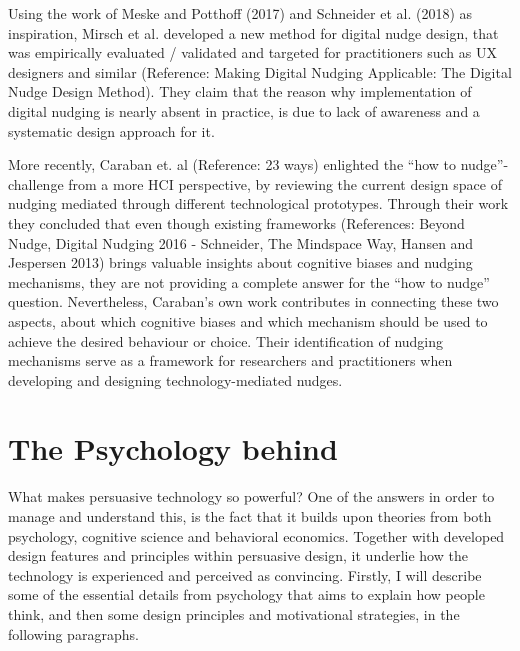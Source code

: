 Using the work of Meske and Potthoff (2017) and Schneider et al. (2018) as inspiration, Mirsch et al. developed a new method for digital nudge design, that was empirically evaluated / validated and targeted for practitioners such as UX designers and similar (Reference: Making Digital Nudging Applicable: The Digital Nudge Design Method). They claim that the reason why implementation of digital nudging is nearly absent in practice, is due to lack of awareness and a systematic design approach for it.

More recently, Caraban et. al (Reference: 23 ways) enlighted the “how to nudge”-challenge from a more HCI perspective, by reviewing the current design space of nudging mediated through different technological prototypes. Through their work they concluded that even though existing frameworks (References: Beyond Nudge, Digital Nudging 2016 - Schneider, The Mindspace Way, Hansen and Jespersen 2013) brings valuable insights about cognitive biases and nudging mechanisms, they are not providing a complete answer for the “how to nudge” question. Nevertheless, Caraban’s own work contributes in connecting these two aspects, about which cognitive biases and which mechanism should be used to achieve the desired behaviour or choice. Their identification of nudging mechanisms serve as a framework for researchers and practitioners when developing and designing technology-mediated nudges. 

\section{The Psychology behind }
What makes persuasive technology so powerful? One of the answers in order to manage and understand this, is the fact that it builds upon theories from both psychology, cognitive science and behavioral economics. Together with developed design features and principles within persuasive design, it underlie how the technology is experienced and perceived as convincing. Firstly, I will describe some of the essential details from psychology that aims to explain how people think, and then some design principles and motivational strategies, in the following paragraphs. 

